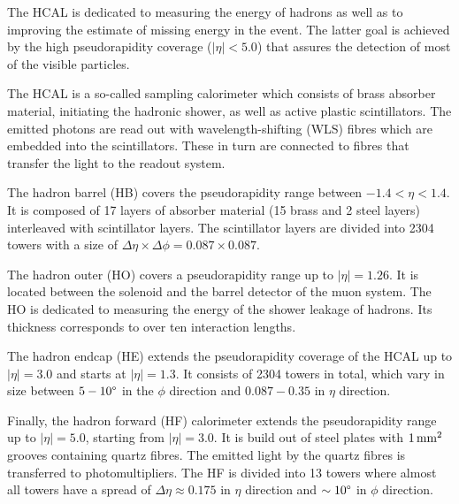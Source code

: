 The HCAL is dedicated to measuring the energy of hadrons as well as to improving the estimate of missing energy in the event.
The latter goal is achieved by the high pseudorapidity coverage ($|\eta|<5.0$) that assures the detection of most of the visible particles.

The HCAL is a so-called sampling calorimeter which consists of brass absorber material, initiating the hadronic shower, as well as active plastic scintillators.
The emitted photons are read out with wavelength-shifting (WLS) fibres which are embedded into the scintillators.
These in turn are connected to fibres that transfer the light to the readout system.

The hadron barrel (HB) covers the pseudorapidity range between $-1.4 < \eta < 1.4$.
It is composed of 17 layers of absorber material (15 brass and 2 steel layers) interleaved with scintillator layers.
The scintillator layers are divided into 2304 towers with a size of $\Delta \eta \times \Delta \phi = 0.087 \times 0.087$.

The hadron outer (HO) covers a pseudorapidity range up to $|\eta|=1.26$.
It is located between the solenoid and the barrel detector of the muon system.
The HO is dedicated to measuring the energy of the shower leakage of hadrons.
Its thickness corresponds to over ten interaction lengths.

The hadron endcap (HE) extends the pseudorapidity coverage of the HCAL up to $|\eta|=3.0$ and starts at $|\eta|=1.3$.
It consists of 2304 towers in total, which vary in size between $5-10\degree$ in the $\phi$ direction and $0.087-0.35$ in $\eta$ direction.

Finally, the hadron forward (HF) calorimeter extends the pseudorapidity range up to $|\eta|=5.0$, starting from $|\eta|=3.0$.
It is build out of steel plates with $1\,\text{mm}^2$ grooves containing quartz fibres.
The emitted light by the quartz fibres is transferred to photomultipliers.
The HF is divided into 13 towers where almost all towers have a spread of $\Delta \eta \approx 0.175$ in $\eta$ direction and $\sim 10\degree$ in $\phi$ direction.
 
